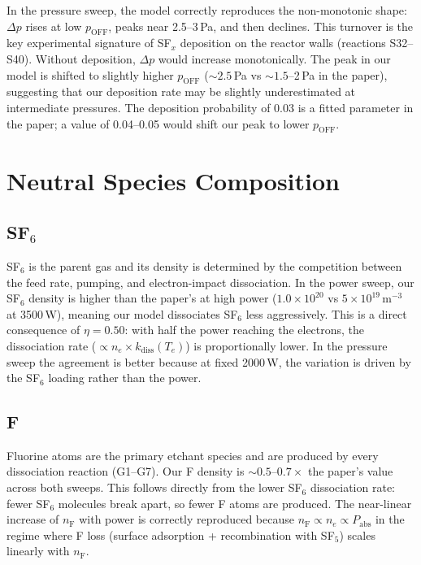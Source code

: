 \documentclass[11pt,a4paper]{article}
\begin{document}
In the pressure sweep, the model correctly reproduces the non-monotonic shape: $\Delta p$ rises at low $p_\text{OFF}$, peaks near 2.5--3\,Pa, and then declines. This turnover is the key experimental signature of SF$_x$ deposition on the reactor walls (reactions S32--S40). Without deposition, $\Delta p$ would increase monotonically. The peak in our model is shifted to slightly higher $p_\text{OFF}$ (${\sim}2.5$\,Pa vs ${\sim}1.5$--2\,Pa in the paper), suggesting that our deposition rate may be slightly underestimated at intermediate pressures. The deposition probability of 0.03 is a fitted parameter in the paper; a value of 0.04--0.05 would shift our peak to lower $p_\text{OFF}$.

\section{Neutral Species Composition}

\subsection{SF$_6$}

SF$_6$ is the parent gas and its density is determined by the competition between the feed rate, pumping, and electron-impact dissociation. In the power sweep, our SF$_6$ density is higher than the paper's at high power ($1.0\times10^{20}$ vs $5\times10^{19}$\,m$^{-3}$ at 3500\,W), meaning our model dissociates SF$_6$ less aggressively. This is a direct consequence of $\eta = 0.50$: with half the power reaching the electrons, the dissociation rate ($\propto n_e \times k_\text{diss}(T_e)$) is proportionally lower. In the pressure sweep the agreement is better because at fixed 2000\,W, the variation is driven by the SF$_6$ loading rather than the power.

\subsection{F}

Fluorine atoms are the primary etchant species and are produced by every dissociation reaction (G1--G7). Our F density is ${\sim}0.5$--$0.7\times$ the paper's value across both sweeps. This follows directly from the lower SF$_6$ dissociation rate: fewer SF$_6$ molecules break apart, so fewer F atoms are produced. The near-linear increase of $n_\text{F}$ with power is correctly reproduced because $n_\text{F} \propto n_e \propto P_\text{abs}$ in the regime where F loss (surface adsorption + recombination with SF$_5$) scales linearly with $n_\text{F}$.
\end{document}
